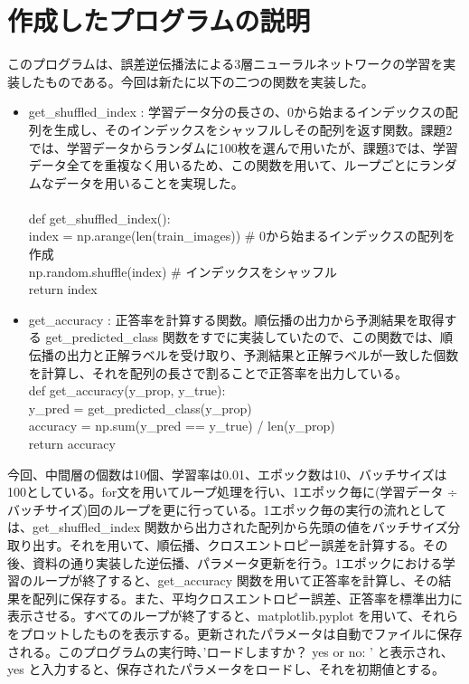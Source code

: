 \documentclass[11px,a4,dvipdfmx]{jsarticle}
\begin{document}
\section{作成したプログラムの説明}
このプログラムは、誤差逆伝播法による3層ニューラルネットワークの学習を実装したものである。今回は新たに以下の二つの関数を実装した。
\begin{itemize}
    \item get\_shuffled\_index : 学習データ分の長さの、0から始まるインデックスの配列を生成し、そのインデックスをシャッフルしその配列を返す関数。課題2では、学習データからランダムに100枚を選んで用いたが、課題3では、学習データ全てを重複なく用いるため、この関数を用いて、ループごとにランダムなデータを用いることを実現した。\\\\
    def get\_shuffled\_index():\\
    index = np.arange(len(train\_images)) \# 0から始まるインデックスの配列を作成\\
    np.random.shuffle(index) \# インデックスをシャッフル\\
    return index\\
    \item get\_accuracy : 正答率を計算する関数。順伝播の出力から予測結果を取得する get\_predicted\_class 関数をすでに実装していたので、この関数では、順伝播の出力と正解ラベルを受け取り、予測結果と正解ラベルが一致した個数を計算し、それを配列の長さで割ることで正答率を出力している。\\
    def get\_accuracy(y\_prop, y\_true):\\
    y\_pred = get\_predicted\_class(y\_prop) \\
    accuracy = np.sum(y\_pred == y\_true) / len(y\_prop)\\
    return accuracy
\end{itemize}
今回、中間層の個数は10個、学習率は0.01、エポック数は10、バッチサイズは100としている。for文を用いてループ処理を行い、1エポック毎に(学習データ ÷ バッチサイズ)回のループを更に行っている。1エポック毎の実行の流れとしては、get\_shuffled\_index 関数から出力された配列から先頭の値をバッチサイズ分取り出す。それを用いて、順伝播、クロスエントロピー誤差を計算する。その後、資料の通り実装した逆伝播、パラメータ更新を行う。1エポックにおける学習のループが終了すると、get\_accuracy 関数を用いて正答率を計算し、その結果を配列に保存する。また、平均クロスエントロピー誤差、正答率を標準出力に表示させる。すべてのループが終了すると、matplotlib.pyplot を用いて、それらをプロットしたものを表示する。更新されたパラメータは自動でファイルに保存される。このプログラムの実行時、'ロードしますか？ yes or no:  ' と表示され、yes と入力すると、保存されたパラメータをロードし、それを初期値とする。
\end{document}
